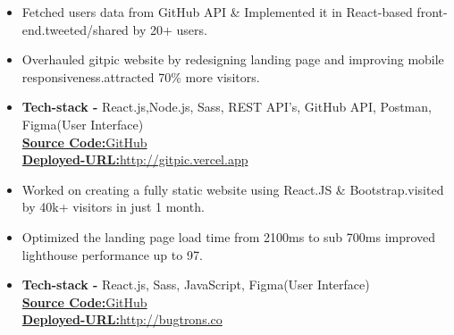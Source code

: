 \documentclass[10pt,a4paper,ragged2e]{altacv}
\begin{document}
\begin{itemize}
\item Fetched users data from GitHub API \& Implemented it in React-based front-end.tweeted/shared by 20+ users.
\item Overhauled gitpic website by redesigning landing page and improving mobile responsiveness.attracted 70\% more visitors.
\item \textbf{Tech-stack -} React.js,Node.js, Sass, REST API's,  GitHub API, Postman, Figma(User Interface)
\\
 \href{https://github.com/ghulamyazdani/Gitpic}{\textbf{Source Code:}GitHub}
 \\
 \href{http://gitpic.vercel.app}{\textbf{Deployed-URL:}http://gitpic.vercel.app}

\end{itemize}
\smallskip
{}
\begin{itemize}
\item Worked on creating a fully static website using React.JS \& Bootstrap.visited by 40k+ visitors in just 1 month.
\item Optimized the landing page load time from 2100ms to sub 700ms improved lighthouse performance up to 97.
\item \textbf{Tech-stack -} React.js, Sass, JavaScript, Figma(User Interface)
\\
 \href{https://github.com/ghulamyazdani/bugtrons.co}{\textbf{Source Code:}GitHub}
 \\
 \href{http://bugtrons.co}{\textbf{Deployed-URL:}http://bugtrons.co}

\end{itemize}
\smallskip
\end{document}
